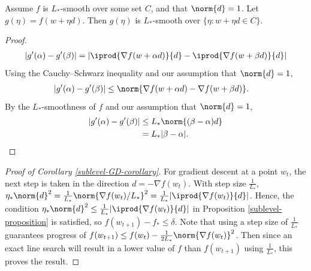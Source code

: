 \documentclass[10pt]{article} %
\begin{document}
\begin{lemma}
    \label{chord-smoothness-lemma}
    Assume $f$ is $L_{*}$-smooth over some set $C$, and that $\norm{d} = 1$. Let \( g(\eta) = f(w + \eta d) \). Then $g(\eta)$ is $L_{*}$-smooth over $\{\eta: w + \eta d \in C\}$.
\end{lemma}
\begin{proof}
    \begin{align*}
        |g'(\alpha) - g'(\beta)| = |\iprod{\nabla f(w + \alpha d)}{d} - \iprod{\nabla f(w + \beta d)}{d}|
    \end{align*}
    Using the Cauchy–Schwarz inequality and our assumption that $\norm{d} = 1$,
    \begin{align*}
        |g'(\alpha) - g'(\beta)| & \leq \norm{\nabla f(w + \alpha d) - \nabla f(w + \beta d)}.
    \end{align*}
    By the $L_{*}$-smoothness of $f$ and our assumption that $\norm{d} = 1$,
    \begin{align*}
        |g'(\alpha) - g'(\beta)| & \leq L_{*}\norm{(\beta - \alpha)d} \\
                                 & = L_{*}|\beta - \alpha|.
    \end{align*}
\end{proof}
\begin{proof}[Proof of Corollary \ref{sublevel-GD-corollary}]
    For gradient descent at a point $w_{t}$, the next step is taken in the direction $d = -\nabla f(w_{t})$. With step size $\frac{1}{L_{*}}$, 
    $\eta_{*} \norm{d}^2 = \frac{1}{L_*}\norm{\nabla f(w_t)/L_*}^2 = \frac{1}{L_{*}} |\iprod{\nabla f(w_{t})}{d}|$. Hence, the condition
    $\eta_{*} \norm{d}^2 \leq \frac{1}{L_{*}} |\iprod{\nabla f(w_{t})}{d}|$ in Proposition \ref{sublevel-proposition} is satisfied, so $f(w_{t+1}) - f_{*} \leq \delta$. Note that using a step size of $\frac{1}{L_{*}}$ guarantees progress of $f(w_{t+1}) \leq f(w_{t}) - \frac{1}{2L_{*}}\norm{\nabla f(w_{t})}^2$. Then since an exact line search will result in a lower value of $f$ than $f(w_{t+1})$ using $\frac{1}{L_{*}}$, this proves the result.
\end{proof}
\end{document}
